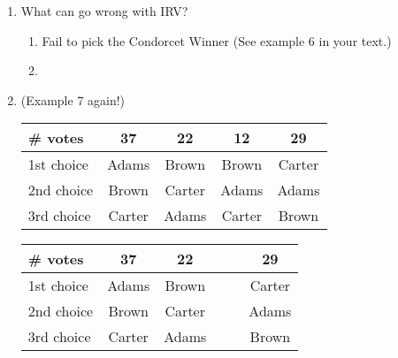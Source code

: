\documentclass[12pt]{article}
\begin{document}
\begin{enumerate}
\begin{tabular}{l || c |c|c|c|}
\end{tabular}

\vfill
\newpage
\item What can go wrong with IRV?
	\begin{enumerate}
	\item Fail to pick the Condorcet Winner (See example 6 in your text.)
	\item \quad
	
	\vfill
	\end{enumerate}
	
\item (Example 7 again!)\\
\begin{tabular}{l || c |c|c|c|}
\# votes&37&22&12&29\\
\hline
1st choice&Adams&Brown&Brown&Carter\\
2nd choice&Brown&Carter&Adams&Adams\\
3rd choice&Carter&Adams&Carter&Brown\\
\end{tabular}

\vspace{1cm}

\begin{tabular}{l || c |c|c|c|c|}
\# votes&37&22&\quad\hspace{2cm}\quad&\quad\hspace{2cm}\quad&29\\
\hline
1st choice&Adams&Brown&&&Carter\\
2nd choice&Brown&Carter&&&Adams\\
3rd choice&Carter&Adams&&&Brown\\
\end{tabular}
\vfill
\end{enumerate}
\end{document}
